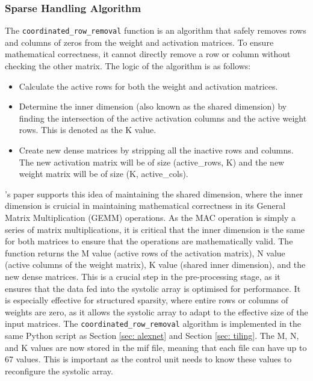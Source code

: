 \documentclass[12pt, a4paper, ukenglish]{article}
\begin{document}
    \subsubsection{Sparse Handling Algorithm} \label{sec: sparse handling algo}
    The \texttt{coordinated\_row\_removal} function is an algorithm that safely removes rows and columns of zeros from the weight and activation matrices. To ensure mathematical correctness, it cannot directly remove a row or column without checking the other matrix. The logic of the algorithm is as follows:
    \begin{itemize}
        \item Calculate the active rows for both the weight and activation matrices.
        \item Determine the inner dimension (also known as the shared dimension) by finding the intersection of the active activation columns and the active weight rows. This is denoted as the K value. 
        \item Create new dense matrices by stripping all the inactive rows and columns. The new activation matrix will be of size (active\_rows, K) and the new weight matrix will be of size (K, active\_cols).
    \end{itemize}
    \textcite{qin_sigma_2020}'s paper supports this idea of maintaining the shared dimension, where the inner dimension is cruicial in maintaining mathematical correctness in its General Matrix Multiplication (GEMM) operations. As the MAC operation is simply a series of matrix multiplications, it is critical that the inner dimension is the same for both matrices to ensure that the operations are mathematically valid.   
    The function returns the M value (active rows of the activation matrix), N value (active columns of the weight matrix), K value (shared inner dimension), and the new dense matrices. This is a crucial step in the pre-processing stage, as it ensures that the data fed into the systolic array is optimised for performance. It is especially effective for structured sparsity, where entire rows or columns of weights are zero, as it allows the systolic array to adapt to the effective size of the input matrices. 
    The \texttt{coordinated\_row\_removal} algorithm is implemented in the same Python script as Section \ref{sec: alexnet} and Section \ref{sec: tiling}. The M, N, and K values are now stored in the mif file, meaning that each file can have up to 67 values. This is important as the control unit needs to know these values to reconfigure the systolic array.
\end{document}
